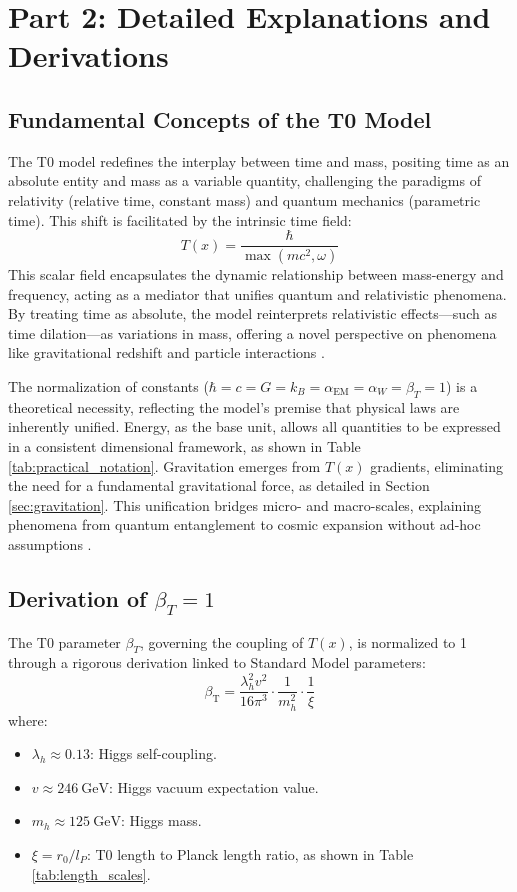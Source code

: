 \documentclass[12pt,a4paper]{article}
\newcommand{\Tfield}{T(x)}
\newcommand{\betaT}{\beta_{\text{T}}}
\begin{document}
	\section{Part 2: Detailed Explanations and Derivations}
	\label{sec:derivations}
	
	\subsection{Fundamental Concepts of the T0 Model}
	\label{subsec:concepts}
	
	The T0 model redefines the interplay between time and mass, positing time as an absolute entity and mass as a variable quantity, challenging the paradigms of relativity (relative time, constant mass) and quantum mechanics (parametric time). This shift is facilitated by the intrinsic time field:
	\[
	\Tfield = \frac{\hbar}{\max(m c^2, \omega)}
	\]
	This scalar field encapsulates the dynamic relationship between mass-energy and frequency, acting as a mediator that unifies quantum and relativistic phenomena. By treating time as absolute, the model reinterprets relativistic effects—such as time dilation—as variations in mass, offering a novel perspective on phenomena like gravitational redshift and particle interactions \cite{pascher_zeit_2025}.
	
	The normalization of constants (\(\hbar = c = G = k_B = \alpha_{\text{EM}} = \alpha_W = \beta_T = 1\)) is a theoretical necessity, reflecting the model’s premise that physical laws are inherently unified. Energy, as the base unit, allows all quantities to be expressed in a consistent dimensional framework, as shown in Table \ref{tab:practical_notation}. Gravitation emerges from \(\Tfield\) gradients, eliminating the need for a fundamental gravitational force, as detailed in Section \ref{sec:gravitation}. This unification bridges micro- and macro-scales, explaining phenomena from quantum entanglement to cosmic expansion without ad-hoc assumptions \cite{pascher_emergente_2025}.
	
	\subsection{Derivation of \(\beta_T = 1\)}
	\label{subsec:beta_derivation}
	
	The T0 parameter \(\beta_T\), governing the coupling of \(\Tfield\), is normalized to 1 through a rigorous derivation linked to Standard Model parameters:
	\[
	\betaT = \frac{\lambda_h^2 v^2}{16 \pi^3} \cdot \frac{1}{m_h^2} \cdot \frac{1}{\xi}
	\]
	where:
	\begin{itemize}
		\item \(\lambda_h \approx 0.13\): Higgs self-coupling.
		\item \(v \approx \SI{246}{\giga\electronvolt}\): Higgs vacuum expectation value.
		\item \(m_h \approx \SI{125}{\giga\electronvolt}\): Higgs mass.
		\item \(\xi = r_0/l_P\): T0 length to Planck length ratio, as shown in Table \ref{tab:length_scales}.
	\end{itemize}
	
\end{document}
